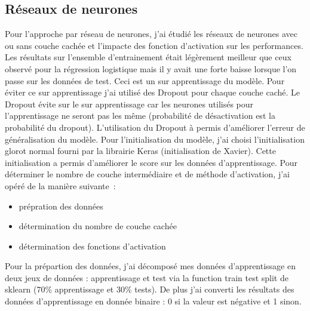 \documentclass[12pt]{scrartcl} %
\begin{document}
\subsection{Réseaux de neurones}
Pour l'approche par réseau de neurones, j'ai étudié les réseaux de neurones avec ou sans couche cachée et l'impacte des fonction d'activation sur les performances. Les résultats sur l'ensemble d'entrainement était légèrement meilleur que ceux observé pour la régression logistique mais il y avait une forte baisse lorsque l'on passe sur les données de test. Ceci est un sur apprentissage du modèle. Pour éviter ce sur apprentissage j'ai utilisé des Dropout pour chaque couche caché. Le Dropout évite sur le sur apprentissage car les neurones utilisés pour l'apprentissage ne seront pas les même (probabilité de désactivation est la probabilité du dropout). L'utilisation du Dropout à permis d'améliorer l'erreur de généralisation du modèle. Pour l'initialisation du modèle, j'ai choisi l'initialisation glorot normal fourni par la librairie Keras (initialisation de Xavier). Cette initialisation a permis d'améliorer le score sur les données d'apprentissage. Pour déterminer le nombre de couche intermédiaire et de méthode d'activation, j'ai opéré de la manière suivante~:~
\begin{itemize}
\item prépration des données
\item détermination du nombre de couche cachée
\item détermination des fonctions d'activation
\end{itemize}
Pour la prépartion des données, j'ai décomposé mes données d'apprentissage en deux jeux de données : apprentissage et test via la function train test split de sklearn (70\% apprentissage et 30\% tests). De plus j'ai converti les résultats des données d'apprentissage en donnée binaire : 0 si la valeur est négative et 1 sinon.
\end{document}
